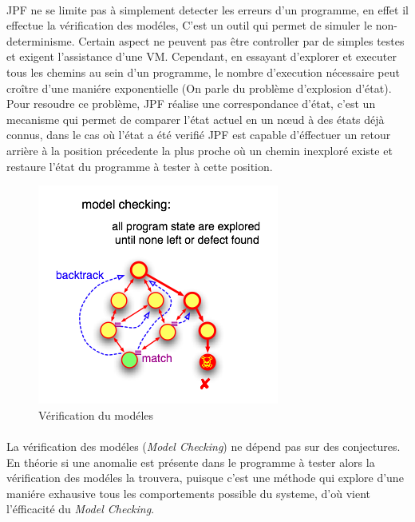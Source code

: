       \paragraph{}
	\gls{JPF} ne se limite pas à simplement detecter les erreurs d'un programme, en effet il effectue la vérification des modéles,
	C'est un outil qui permet de simuler le non-determinisme. Certain aspect ne peuvent pas être controller par de simples testes
	et exigent l'assistance d'une \gls{VM}.
	Cependant, en essayant d'explorer et executer tous les chemins au sein d'un programme, le nombre d'execution nécessaire peut
	croître d'une maniére exponentielle (On parle du problème d'explosion d'état). Pour resoudre ce problème, \gls{JPF} réalise une
	correspondance d'état, c'est un mecanisme qui permet de comparer l'état actuel en un n\oe{}ud à des états déjà connus, dans le cas où l'état
	a été verifié \gls{JPF} est capable d'éffectuer un retour arrière à la position précedente la plus proche où un chemin inexploré existe et 
	restaure l'état du programme à tester à cette position.
	
      \begin{figure}[H]
	\centering
	  \includegraphics[scale=0.5]{images/jpf-model-checking.png}
	\caption{Vérification du modéles}
      \end{figure}
      
      \paragraph{}
	La vérification des modéles (\textit{Model Checking}) ne dépend pas sur des conjectures. En théorie si une anomalie est présente dans le programme à tester
	alors la vérification des modéles la trouvera, puisque c'est une méthode qui explore d'une maniére exhausive tous les comportements possible du systeme,
	d'où vient l'éfficacité du \textit{Model Checking}.
